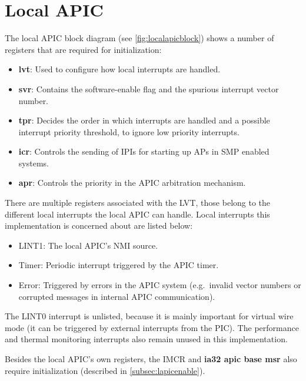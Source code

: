 \clearpage

\section{Local APIC}
\label{sec:lapicinit}

The local APIC block diagram (see \autoref{fig:localapicblock}) shows a number of registers that
are required for initialization:

\begin{itemize}
  \item \textbf{\gls{lvt}}: Used to configure how local interrupts are handled.
  \item \textbf{\gls{svr}}: Contains the software-enable flag and the spurious interrupt vector number.
  \item \textbf{\gls{tpr}}: Decides the order in which interrupts are handled and a possible interrupt
        priority threshold, to ignore low priority interrupts.
  \item \textbf{\gls{icr}}: Controls the sending of IPIs for starting up APs in SMP enabled systems.
  \item \textbf{\gls{apr}}: Controls the priority in the APIC arbitration mechanism.
\end{itemize}

There are multiple registers associated with the LVT, those belong to the different local
interrupts the local APIC can handle. Local interrupts this implementation is concerned about are
listed below:

\begin{itemize}
  \item LINT1: The local APIC's NMI source.
  \item Timer: Periodic interrupt triggered by the APIC timer.
  \item Error: Triggered by errors in the APIC system (e.g.\ invalid vector numbers or corrupted messages
        in internal APIC communication).
\end{itemize}

The LINT0 interrupt is unlisted, because it is mainly important for virtual wire mode (it can be
triggered by external interrupts from the PIC). The performance and thermal monitoring interrupts
also remain unused in this implementation.

Besides the local APIC's own registers, the IMCR and \textbf{\gls{ia32 apic base msr}} also require
initialization (described in \autoref{subsec:lapicenable}).

